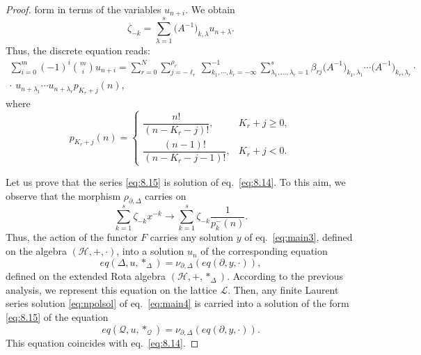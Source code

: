 \documentclass[10pt,a4paper]{amsart}
\newcommand{\nn}{\nonumber}
\begin{document}
\begin{proof}
form in terms of the variables $u_{n+i}$. We obtain
\begin{equation}
\zeta _{-k}= \sum _{\lambda =1}^{s} \big(A^{-1}\big)_{k,\lambda}u_{n+
\lambda}.
\label{eq8.21}
\end{equation}
Thus, the discrete equation reads:
\begin{eqnarray}\nn
\sum _{i=0}^{m}(-1)^{i}\binom{m}{i}u_{n+i} = \sum _{r=0}^{N} \sum _{j=-
\ell _{r}}^{\rho _{r}} \sum _{k_{1},\cdots ,k_{r}=-\infty}^{-1} \sum _{
\lambda _{1},\ldots ,\lambda _{r}=1}^{s} \beta _{rj} \big(A^{-1}\big)_{k_{1},
\lambda _{1}}\cdots \big(A^{-1}\big)_{k_{r},\lambda _{r}} \cdot
\label{eq8.22}
\\
\cdot \,\, u_{n+\lambda _{1}}\cdots u_{n+\lambda _{r}}p_{K_{r}+j}(n),
\end{eqnarray}
where
\begin{equation}
p_{K_r+j}(n)=
\begin{cases}
\dfrac{n!}{(n-K_r-j)!}, & K_r+j\geq 0,
\\[10pt]
\dfrac{(n-1)!}{(n-K_r-j-1)!}, & K_r+j <0.
\end{cases}
\label{eq8.23}
\end{equation}

Let us prove that the series  \eqref{eq:8.15} is solution of eq.~\eqref{eq:8.14}. To this aim, we observe that the morphism
$\rho _{\partial ,\Delta}$ carries on
\begin{equation}
\sum _{k=1}^{s} \zeta _{-k} x^{-k} \longrightarrow \sum _{k=1}^{s}
\zeta _{-k} \frac{1}{p_{k}^{-}(n)}.
\label{eq8.24}
\end{equation}
Thus, the action of the functor $F$ carries any solution $y$ of eq.~\eqref{eq:main3},
defined on the algebra $(\mathcal{H},+,\cdot )$, into a solution
$u_{n}$ of the corresponding equation
\begin{equation*}
eq(\Delta ,u,*_{\Delta})=\nu _{\partial ,\Delta}(eq(\partial , y,
\cdot )),
\end{equation*}
defined on the extended Rota algebra $(\mathcal{H},+,*_{\Delta})$. According
to the previous analysis, we represent this equation on the lattice
$\mathcal{L}$. Then, any finite Laurent series solution  \eqref{eq:npolsol} of  eq.~\eqref{eq:main4} is carried into a solution of
the form  \eqref{eq:8.15} of the equation
\begin{equation*}
eq(\mathcal{Q},u,*_{\mathcal{Q}})=\nu _{\partial ,\Delta}(eq(
\partial ,y,\cdot )).
\end{equation*}
This equation coincides with eq.~\eqref{eq:8.14}.
\end{proof}
\end{document}
